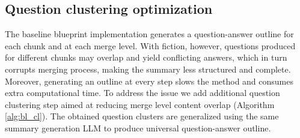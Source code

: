\documentclass{superfri}
\begin{document}
\subsection{Question clustering optimization}
The baseline blueprint implementation generates a question-answer outline for each chunk and at each merge level. 
With fiction, however, questions produced for different chunks may overlap and yield conflicting answers, which in turn corrupts merging process, 
making the summary less structured and complete. 
Moreover, generating an outline at every step slows the method and consumes extra computational time.
To address the issue we add additional question clustering step aimed at reducing merge level content overlap  (Algorithm \ref{alg:bl_cl}). 
The obtained question clusters are generalized using the same summary generation LLM to produce universal question-answer outline.
\end{document}
